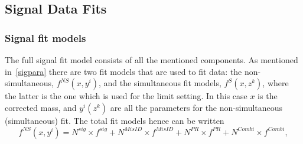 %
%
\subsection{Signal Data Fits}
\label{fitsens}


\subsubsection{Signal fit models}
The full signal fit model consists of all the mentioned components. As mentioned in~\autoref{sigpara} there are two fit models that are used to fit data: the non-simultaneous, $f^{NS}(x,y^{i})$, and the simultaneous fit models, $f^{S}(x,{z^{k}})$, where the latter is the one which is used for the limit setting. In this case $x$ is the corrected mass, and $y^{i}(z^{k})$ are all the parameters for the non-simultaneous (simultaneous) fit. The total fit models hence can be written 
\begin{equation}
f^{NS}(x,y^{i})=N^{sig}\times f^{sig} + N^{MisID} \times f^{MisID} + N^{PR}\times f^{PR} + N^{Combi} \times f^{Combi},
\label{eq:fullhypo}
\end{equation}

